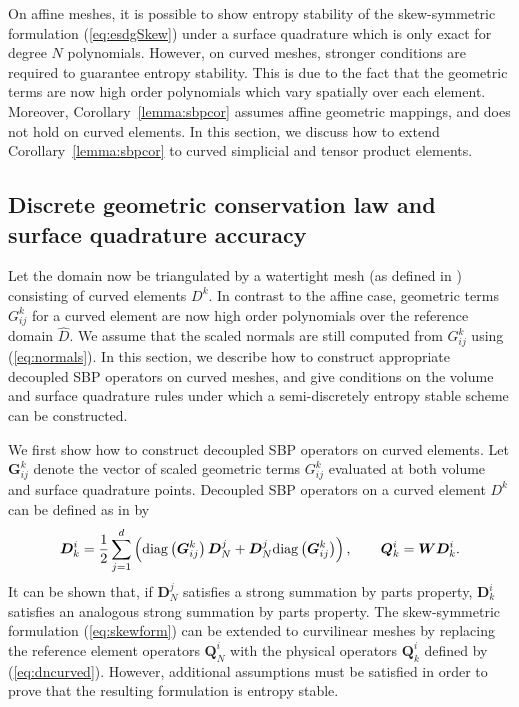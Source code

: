 \documentclass[review]{siamart0216}
\theoremstyle{assumption}
\renewcommand{\hat}[1]{\hat{#1}}
\newcommand{\LRp}[1]{\left( #1 \right)}
\renewcommand{\hat}{\widehat}
\newcommand{\diag}[1]{{\rm diag}\LRp{#1}}
\begin{document}
On affine meshes, it is possible to show entropy stability of the skew-symmetric formulation (\ref{eq:esdgSkew}) under a surface quadrature which is only exact for degree $N$ polynomials.  However, on curved meshes, stronger conditions are required to guarantee entropy stability.  This is due to the fact that the geometric terms are now high order polynomials which vary spatially over each element.  Moreover, Corollary~\ref{lemma:sbpcor} assumes affine geometric mappings, and does not hold on curved elements.  In this section, we discuss how to extend Corollary~\ref{lemma:sbpcor} to curved simplicial and tensor product elements.  

\subsection{Discrete geometric conservation law and surface quadrature accuracy}

Let the domain now be triangulated by a watertight mesh (as defined in \cite{chan2018discretely}) consisting of curved elements $D^k$.  
In contrast to the affine case, geometric terms $G^k_{ij}$ for a curved element are now high order polynomials over the reference domain $\hat{D}$.  We assume that the scaled normals are still computed from $G^k_{ij}$ using (\ref{eq:normals}).  In this section, we describe how to construct appropriate decoupled SBP operators on curved meshes, and give conditions on the volume and surface quadrature rules under which a semi-discretely entropy stable scheme can be constructed.

We first show how to construct decoupled SBP operators on curved elements.  Let $\bm{G}^k_{ij}$ denote the vector of scaled geometric terms ${G}^k_{ij}$ evaluated at both volume and surface quadrature points.  Decoupled SBP operators on a curved element $D^k$ can be defined as in \cite{chan2018discretely} by
\begin{equation}
\bm{D}^i_k = \frac{1}{2}\sum_{j=1}^d \LRp{\diag{\bm{G}^k_{ij}}{\bm{D}}^j_N + {\bm{D}}^j_N\diag{\bm{G}^k_{ij}}}, \qquad \bm{Q}^i_k = \bm{W} \bm{D}^i_k.
\label{eq:dncurved}
\end{equation}
It can be shown that, if $\bm{D}^j_N$ satisfies a strong summation by parts property, $\bm{D}^i_k$ satisfies an analogous strong summation by parts property.
The skew-symmetric formulation (\ref{eq:skewform}) can be extended to curvilinear meshes by replacing the reference element operators $\bm{Q}^i_N$ with the physical operators $\bm{Q}^i_k$ defined by (\ref{eq:dncurved}).  However, additional assumptions must be satisfied in order to prove that the resulting formulation is entropy stable.  
\end{document}
